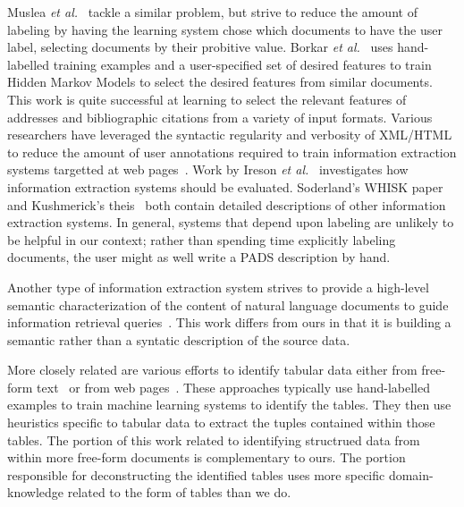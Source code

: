Muslea {\em et al.}~\cite{muslea+:active-learning} tackle a similar
problem, but strive to reduce the amount of labeling by having the
learning system chose which documents to have the user label,
selecting documents by their probitive value.  Borkar {\em et
al.}~\cite{borkar+:text-segmentation} uses hand-labelled training
examples and a user-specified set of desired features to train Hidden
Markov Models to select the desired features from similar documents.
This work is quite successful at learning to select the relevant
features of addresses and bibliographic citations from a variety of
input formats. Various researchers have leveraged the syntactic
regularity and verbosity of XML/HTML to reduce the amount of user
annotations required to train information extraction systems targetted
at web pages~\cite{Ambite+:ariadne,doorenbos+:shopbot}.
Work by Ireson {\em et al.}~\cite{ireson+:ml-evaluation} investigates
how information extraction systems should be evaluated.  Soderland's
WHISK paper~\cite{soderland:whisk} and Kushmerick's
theis~\cite{kushmerick-phd1997} both contain detailed descriptions of
other information extraction systems.  In general, systems that depend
upon labeling are unlikely to be helpful in our context; rather than
spending time explicitly labeling documents, the user might as well
write a PADS description by hand.

Another type of information extraction system strives to provide a
high-level semantic characterization of the content of natural
language documents to guide information retrieval
queries~\cite{gubanov+:structural-text-search,rus+:information-capture}.
This work differs from ours in that it is building a semantic rather
than a syntatic description of the source data.

More closely related are various efforts to identify tabular data 
either from free-form text~\cite{Ng+:texttables,Pinto+:texttables} or
from web pages~\cite{Lerman+:webtables}.  These approaches typically
use hand-labelled examples to train machine learning systems to
identify the tables.  They then use heuristics specific to tabular
data to extract the tuples contained within those tables.  The portion
of this work related to identifying structrued data from within more
free-form documents is complementary to ours.  The portion responsible
for deconstructing the identified tables uses more specific
domain-knowledge related to the form of tables than we do.

